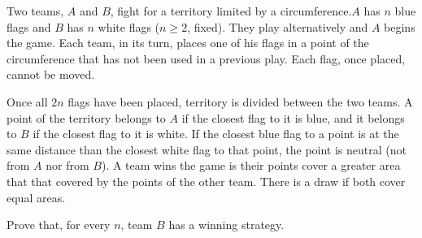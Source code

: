 Two teams, $ A$ and $ B$,  fight for a territory limited by a circumference.$ A$ has $ n$ blue flags and $ B$ has $ n$ white flags ($ n\geq 2$,  fixed). They play alternatively and $ A$ begins the game. Each team, in its turn, places one of his flags in a point of the circumference that has not been used in a previous play. Each flag, once placed, cannot be moved.

Once all $ 2n$ flags have been placed, territory is divided between the two teams. A point of the territory belongs to $ A$ if the closest flag to it is blue, and it belongs to $ B$ if the closest flag to it is white. If the closest blue flag to a point is at the same distance than the closest white flag to that point, the point is neutral (not from $ A$ nor from $ B$). A team wins the game is their points cover a greater area that that covered by the points of the other team. There is a draw if both cover equal areas.

Prove that, for every $ n$,  team $ B$ has a winning strategy.